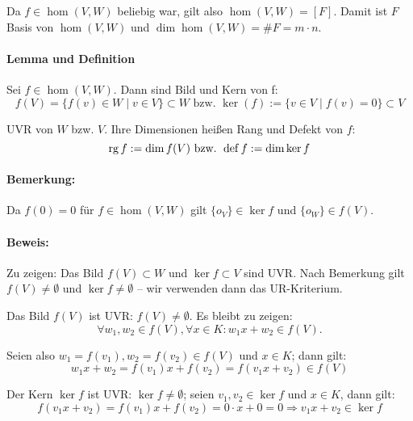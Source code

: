 	Da $f\in\hom (V,W)$ beliebig war, gilt also $\hom (V,W) = [F]$. Damit ist $F$ Basis von $\hom (V,W)$ und $\dim\hom (V,W) = \# F = m\cdot n$.
	
\paragraph{Lemma und Definition}
	Sei $f\in \hom (V,W)$. Dann sind Bild und Kern von f:
		\begin{equation*}
			f(V) = \{f(v)\in W\mid v\in V \}\subset W \text{ bzw. } \ker (f) := \{v\in V\mid f(v) = 0 \} \subset V
		\end{equation*}
	
	UVR von $W$ bzw. $V$. Ihre Dimensionen heißen Rang und Defekt von $f$:
		\begin{equation*}
			\operatorname{rg} f := \dim f(V) \text{ bzw. } \operatorname{def} f := \dim \ker f
		\end{equation*}

\paragraph{Bemerkung: }
	Da $f(0)=0$ für  $f\in \hom (V,W)$ gilt $\{o_V \}\in \ker f$ und $\{o_W \}\in f(V)$.

\paragraph{Beweis: }
	Zu zeigen: Das Bild $f(V)\subset W$ und $\ker f\subset V$ sind UVR. Nach Bemerkung gilt $f(V)\neq \emptyset$ und $\ker f \neq \emptyset$ -- wir verwenden dann das UR-Kriterium.
	
	Das Bild $f(V)$ ist UVR: $f(V) \neq \emptyset$. Es bleibt zu zeigen:
		\begin{equation*}
			\forall w_1,w_2\in f(V), \forall x\in K: w_1x+w_2 \in f(V).
		\end{equation*}
	
	Seien also $w_1 = f(v_1), w_2 = f(v_2) \in f(V)$ und $x\in K$; dann gilt:
		\begin{equation*}
			w_1x+w_2 = f(v_1)x+f(v_2) = f(v_1x+v_2)\in f(V)
		\end{equation*}
		
	Der Kern $\ker f$ ist UVR: $\ker f\neq \emptyset$; seien $v_1,v_2\in \ker f$ und $x\in K$, dann gilt:
		\begin{equation*}
			f(v_1x+v_2) = f(v_1)x+f(v_2) = 0\cdot x + 0 = 0 \Rightarrow v_1x+v_2\in \ker f
		\end{equation*}

